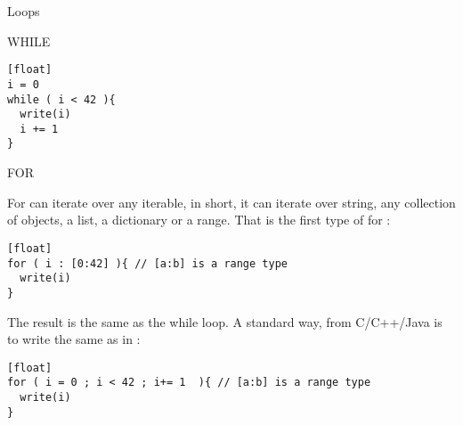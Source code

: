 \begin{section}{Loops}

\begin{subsection}{WHILE}

\begin{lstlisting}[style=JexlStyle][float]
i = 0 
while ( i < 42 ){
  write(i)
  i += 1
}
\end{lstlisting}

\end{subsection}

\begin{subsection}{FOR}

For can iterate over any iterable, 
in short, it can iterate over string, any collection of objects,
a list, a dictionary or a range.
That is the first type of for :

\begin{lstlisting}[style=JexlStyle][float]
for ( i : [0:42] ){ // [a:b] is a range type 
  write(i)
}
\end{lstlisting}
The result is the same as the while loop.
A standard way, from C/C++/Java is to write the same as in :
\begin{lstlisting}[style=JexlStyle][float]
for ( i = 0 ; i < 42 ; i+= 1  ){ // [a:b] is a range type 
  write(i)
}
\end{lstlisting}
\end{subsection}
\end{section}


